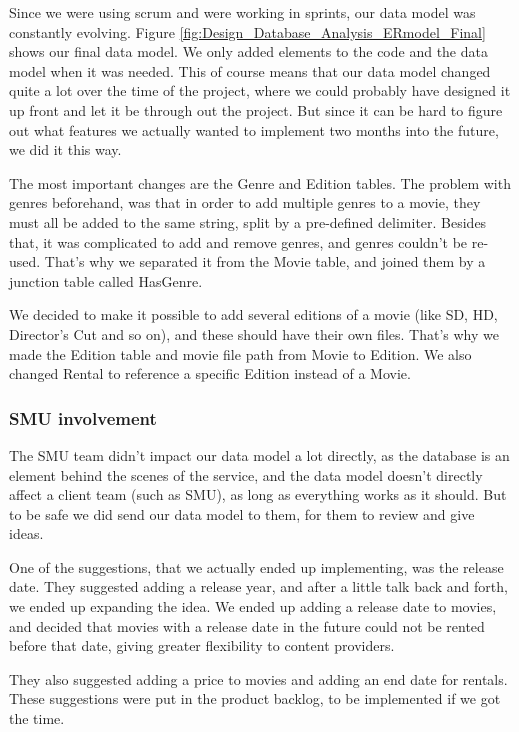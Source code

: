 Since we were using scrum and were working in sprints, our data model was constantly evolving. Figure \ref{fig:Design_Database_Analysis_ERmodel_Final} shows our final data model. We only added elements to the code and the data model when it was needed. This of course means that our data model changed quite a lot over the time of the project, where we could probably have designed it up front and let it be through out the project. But since it can be hard to figure out what features we actually wanted to implement two months into the future, we did it this way.

The most important changes are the Genre and Edition tables. The problem with genres beforehand, was that in order to add multiple genres to a movie, they must all be added to the same string, split by a pre-defined delimiter. Besides that, it was complicated to add and remove genres, and genres couldn't be re-used. That's why we separated it from the Movie table, and joined them by a junction table called HasGenre.

We decided to make it possible to add several editions of a movie (like SD, HD, Director's Cut and so on), and these should have their own files. That's why we made the Edition table and movie file path from Movie to Edition. We also changed Rental to reference a specific Edition instead of a Movie.

\subsubsection{SMU involvement}
\label{Design_Database_Analysis_SMU}

The SMU team didn't impact our data model a lot directly, as the database is an element behind the scenes of the service, and the data model doesn't directly affect a client team (such as SMU), as long as everything works as it should. But to be safe we did send our data model to them, for them to review and give ideas.

One of the suggestions, that we actually ended up implementing, was the release date. They suggested adding a release year, and after a little talk back and forth, we ended up expanding the idea. We ended up adding a release date to movies, and decided that movies with a release date in the future could not be rented before that date, giving greater flexibility to content providers.

They also suggested adding a price to movies and adding an end date for rentals. These suggestions were put in the product backlog, to be implemented if we got the time.

